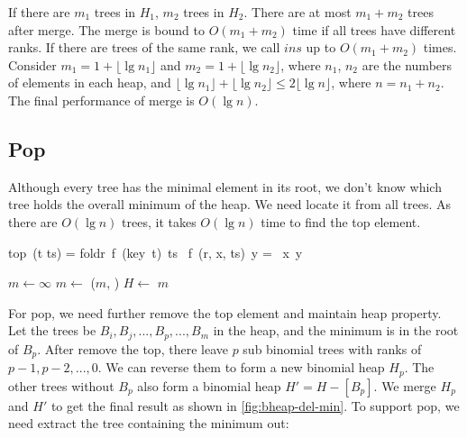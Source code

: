 \documentclass[b5paper]{article}
\begin{document}
If there are $m_1$ trees in $H_1$, $m_2$ trees in $H_2$. There are at most $m_1 + m_2$ trees after merge. The merge is bound to $O(m_1 + m_2)$ time if all trees have different ranks. If there are trees of the same rank, we call $ins$ up to $O(m_1 + m_2)$ times. Consider $m_1 = 1 + \lfloor \lg n_1 \rfloor$ and $m_2 = 1 + \lfloor \lg n_2 \rfloor$, where $n_1$, $n_2$ are the numbers of elements in each heap, and $\lfloor \lg n_1 \rfloor + \lfloor \lg n_2 \rfloor \leq 2 \lfloor \lg n \rfloor$, where $n = n_1 + n_2$. The final performance of merge is $O(\lg n)$.

\subsection{Pop}

Although every tree has the minimal element in its root, we don't know which tree holds the overall minimum of the heap. We need locate it from all trees. As there are $O(\lg n)$ trees, it takes $O(\lg n)$ time to find the top element.

\be
top\ (t \cons ts) = foldr\ f\ (key\ t)\ ts \quad {}\ f\ (r, x, ts)\ y = \min\ x\ y
\ee

\begin{algorithmic}[1]
  \State $m \gets \infty$
    \State $m \gets$ ($m$, )
    \State $H \gets $ 
  \EndWhile
  \State \Return $m$
\EndFunction
\end{algorithmic}

For pop, we need further remove the top element and maintain heap property. Let the trees be $B_i, B_j, ..., B_p, ..., B_m$ in the heap, and the minimum is in the root of $B_p$. After remove the top, there leave $p$ sub binomial trees with ranks of $p-1, p-2, ..., 0$. We can reverse them to form a new binomial heap $H_p$. The other trees without $B_p$ also form a binomial heap $H' = H - [B_p]$. We merge $H_p$ and $H'$ to get the final result as shown in \cref{fig:bheap-del-min}. To support pop, we need extract the tree containing the minimum out:
\end{document}
